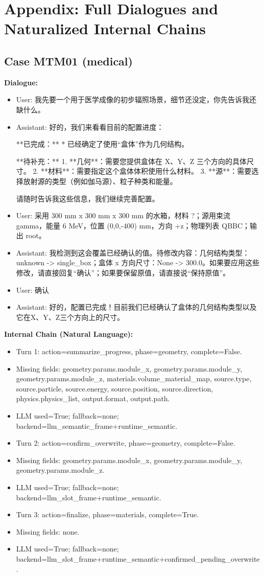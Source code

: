 \documentclass[11pt]{ctexart}
\begin{document}
\section{Appendix: Full Dialogues and Naturalized Internal Chains}
\subsection{Case MTM01 (medical)}
\textbf{Dialogue:}
\begin{itemize}
\item User: 我先要一个用于医学成像的初步辐照场景，细节还没定，你先告诉我还缺什么。
\item Assistant: 好的，我们来看看目前的配置进度：

**已完成：**
*   已经确定了使用“盒体”作为几何结构。

**待补充：**
1.  **几何**：需要您提供盒体在 X、Y、Z 三个方向的具体尺寸。
2.  **材料**：需要指定这个盒体体积使用什么材料。
3.  **源**：需要选择放射源的类型（例如伽马源）、粒子种类和能量。

请随时告诉我这些信息，我们继续完善配置。
\item User: 采用 300 mm x 300 mm x 300 mm 的水箱，材料 ?；源用束流 gamma，能量 6 MeV，位置 (0,0,-400) mm，方向 +z；物理列表 QBBC；输出 root。
\item Assistant: 我检测到这会覆盖已经确认的值。待修改内容：几何结构类型：unknown -> single\_box；盒体 x 方向尺寸：None -> 300.0。如果要应用这些修改，请直接回复“确认”；如果要保留原值，请直接说“保持原值”。
\item User: 确认
\item Assistant: 好的，配置已完成！目前我们已经确认了盒体的几何结构类型以及它在X、Y、Z三个方向上的尺寸。
\end{itemize}
\textbf{Internal Chain (Natural Language):}
\begin{itemize}
\item Turn 1: action=summarize\_progress, phase=geometry, complete=False.
\item Missing fields: geometry.params.module\_x, geometry.params.module\_y, geometry.params.module\_z, materials.volume\_material\_map, source.type, source.particle, source.energy, source.position, source.direction, physics.physics\_list, output.format, output.path.
\item LLM used=True; fallback=none; backend=llm\_semantic\_frame+runtime\_semantic.
\item Turn 2: action=confirm\_overwrite, phase=geometry, complete=False.
\item Missing fields: geometry.params.module\_x, geometry.params.module\_y, geometry.params.module\_z.
\item LLM used=True; fallback=none; backend=llm\_slot\_frame+runtime\_semantic.
\item Turn 3: action=finalize, phase=materials, complete=True.
\item Missing fields: none.
\item LLM used=True; fallback=none; backend=llm\_slot\_frame+runtime\_semantic+confirmed\_pending\_overwrite.
\end{itemize}
\end{document}
